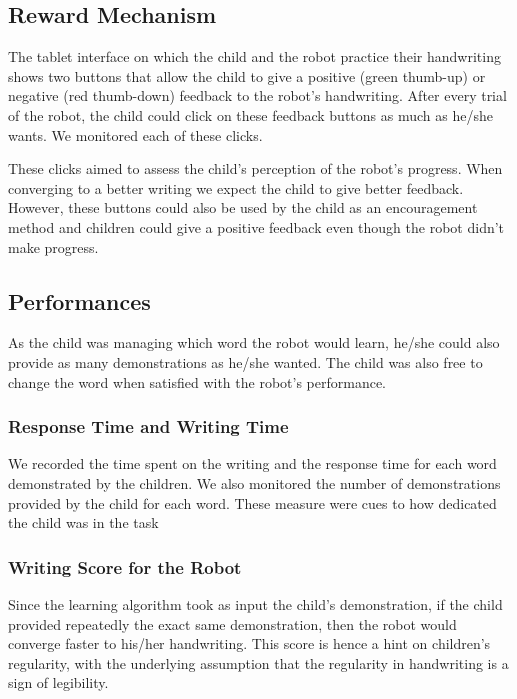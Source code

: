\documentclass[letterpaper, 10 pt, conference]{ieeeconf}  %
\begin{document}
\subsection{Reward Mechanism}
The tablet interface on which the child and the robot practice their handwriting shows two buttons that allow the child to give a positive (green thumb-up) or negative (red thumb-down) feedback to the robot's handwriting.
After every trial of the robot, the child could click on these feedback buttons as much as he/she wants.
We monitored each of these clicks.

These clicks aimed to assess the child's perception of the robot's progress.
When converging to a better writing we expect the child to give better feedback.
However, these buttons could also be used by the child as an encouragement method and children could give a positive feedback even though the robot didn't make progress.

\subsection{Performances}
As the child was managing which word the robot would learn, he/she could also provide as many demonstrations as he/she wanted.
The child was also free to change the word when satisfied with the robot's performance.

\subsubsection{Response Time and Writing Time}
We recorded the time spent on the writing and the response time for each word demonstrated by the children.
We also monitored the number of demonstrations provided by the child for each word.
These measure were cues to how dedicated the child was in the task 

\subsubsection{Writing Score for the Robot}
Since the learning algorithm took as input the child's demonstration, if the child provided repeatedly the exact same demonstration, then the robot would converge faster to his/her handwriting.
This score is hence a hint on children's regularity, with the underlying assumption that the regularity in handwriting is a sign of legibility.
\end{document}
